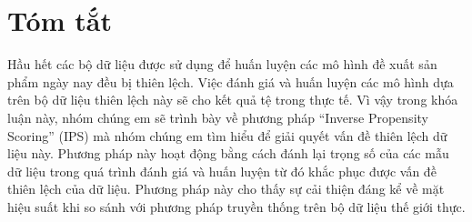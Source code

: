 \chapter*{Tóm tắt}
\label{summary}
Hầu hết các bộ dữ liệu được sử dụng để huấn luyện các mô hình đề xuất sản phẩm ngày nay đều bị thiên lệch. Việc đánh giá và huấn luyện các mô hình dựa trên bộ dữ liệu thiên lệch này sẽ cho kết quả tệ trong thực tế. Vì vậy trong khóa luận này, nhóm chúng em sẽ trình bày về phương pháp “Inverse Propensity Scoring” (IPS) mà nhóm chúng em tìm hiểu để giải quyết vấn đề thiên lệch dữ liệu này. Phương pháp này hoạt động bằng cách đánh lại trọng số của các mẫu dữ liệu trong quá trình đánh giá và huấn luyện từ đó khắc phục được vấn đề thiên lệch của dữ liệu. Phương pháp này cho thấy sự cải thiện đáng kể về mặt hiệu suất khi so sánh với phương pháp truyền thống trên bộ dữ liệu thế giới thực. 